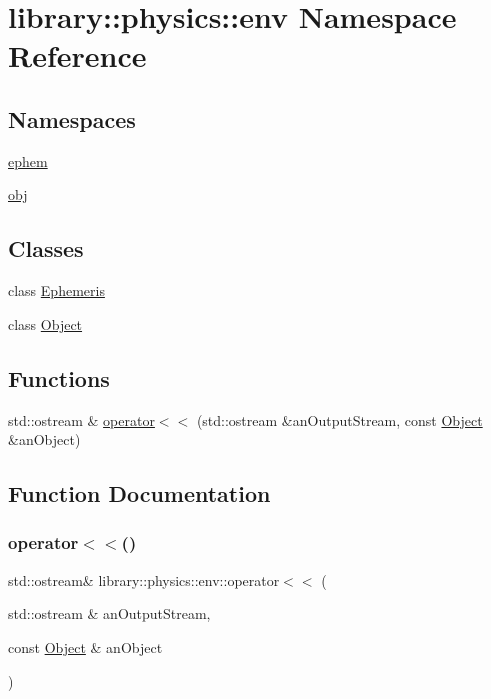 \hypertarget{namespacelibrary_1_1physics_1_1env}{}\section{library\+:\+:physics\+:\+:env Namespace Reference}
\label{namespacelibrary_1_1physics_1_1env}
\subsection*{Namespaces}
\begin{DoxyCompactItemize}
\item 
 \hyperlink{namespacelibrary_1_1physics_1_1env_1_1ephem}{ephem}
\item 
 \hyperlink{namespacelibrary_1_1physics_1_1env_1_1obj}{obj}
\end{DoxyCompactItemize}
\subsection*{Classes}
\begin{DoxyCompactItemize}
\item 
class \hyperlink{classlibrary_1_1physics_1_1env_1_1_ephemeris}{Ephemeris}
\item 
class \hyperlink{classlibrary_1_1physics_1_1env_1_1_object}{Object}
\end{DoxyCompactItemize}
\subsection*{Functions}
\begin{DoxyCompactItemize}
\item 
std\+::ostream \& \hyperlink{namespacelibrary_1_1physics_1_1env_ac884c1af7d9475081d42a05bdd59ac3a}{operator$<$$<$} (std\+::ostream \&an\+Output\+Stream, const \hyperlink{classlibrary_1_1physics_1_1env_1_1_object}{Object} \&an\+Object)
\end{DoxyCompactItemize}


\subsection{Function Documentation}
\mbox{\label{namespacelibrary_1_1physics_1_1env_ac884c1af7d9475081d42a05bdd59ac3a}} 
\subsubsection{\texorpdfstring{operator$<$$<$()}{operator<<()}}
{\footnotesize\ttfamily std\+::ostream\& library\+::physics\+::env\+::operator$<$$<$ (\begin{DoxyParamCaption}\item[{std\+::ostream \&}]{an\+Output\+Stream,  }\item[{const \hyperlink{classlibrary_1_1physics_1_1env_1_1_object}{Object} \&}]{an\+Object }\end{DoxyParamCaption})}

